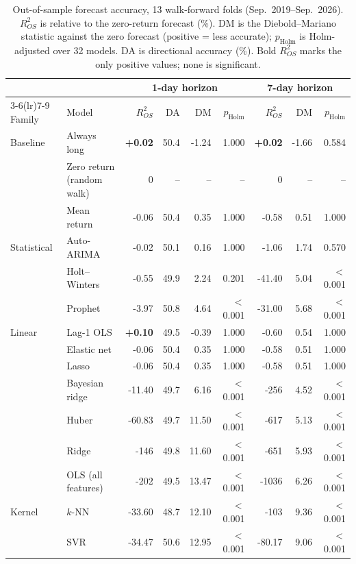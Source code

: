 \begin{table}[t]
\centering
\caption{Out-of-sample forecast accuracy, 13 walk-forward folds (Sep.~2019--Sep.~2026). $R^2_{OS}$ is relative to the zero-return forecast (\%). DM is the Diebold--Mariano statistic against the zero forecast (positive = less accurate); $p_{\mathrm{Holm}}$ is Holm-adjusted over 32 models. DA is directional accuracy (\%). Bold $R^2_{OS}$ marks the only positive values; none is significant.}
\label{tab:main}
\small
\begin{tabular}{llrrrrrrr}
\toprule
 & & \multicolumn{4}{c}{1-day horizon} & \multicolumn{3}{c}{7-day horizon} \\
\cmidrule(lr){3-6}\cmidrule(lr){7-9}
Family & Model & $R^2_{OS}$ & DA & DM & $p_{\mathrm{Holm}}$ & $R^2_{OS}$ & DM & $p_{\mathrm{Holm}}$ \\
\midrule
Baseline & Always long & \textbf{+0.02} & 50.4 & -1.24 & 1.000 & \textbf{+0.02} & -1.66 & 0.584 \\
 & Zero return (random walk) & 0 & -- & -- & -- & 0 & -- & -- \\
 & Mean return & -0.06 & 50.4 & 0.35 & 1.000 & -0.58 & 0.51 & 1.000 \\
\addlinespace[2pt]
Statistical & Auto-ARIMA & -0.02 & 50.1 & 0.16 & 1.000 & -1.06 & 1.74 & 0.570 \\
 & Holt--Winters & -0.55 & 49.9 & 2.24 & 0.201 & -41.40 & 5.04 & $<$0.001 \\
 & Prophet & -3.97 & 50.8 & 4.64 & $<$0.001 & -31.00 & 5.68 & $<$0.001 \\
\addlinespace[2pt]
Linear & Lag-1 OLS & \textbf{+0.10} & 49.5 & -0.39 & 1.000 & -0.60 & 0.54 & 1.000 \\
 & Elastic net & -0.06 & 50.4 & 0.35 & 1.000 & -0.58 & 0.51 & 1.000 \\
 & Lasso & -0.06 & 50.4 & 0.35 & 1.000 & -0.58 & 0.51 & 1.000 \\
 & Bayesian ridge & -11.40 & 49.7 & 6.16 & $<$0.001 & -256 & 4.52 & $<$0.001 \\
 & Huber & -60.83 & 49.7 & 11.50 & $<$0.001 & -617 & 5.13 & $<$0.001 \\
 & Ridge & -146 & 49.8 & 11.60 & $<$0.001 & -651 & 5.93 & $<$0.001 \\
 & OLS (all features) & -202 & 49.5 & 13.47 & $<$0.001 & -1036 & 6.26 & $<$0.001 \\
\addlinespace[2pt]
Kernel & $k$-NN & -33.60 & 48.7 & 12.10 & $<$0.001 & -103 & 9.36 & $<$0.001 \\
 & SVR & -34.47 & 50.6 & 12.95 & $<$0.001 & -80.17 & 9.06 & $<$0.001 \\

\end{tabular}
\end{table}
